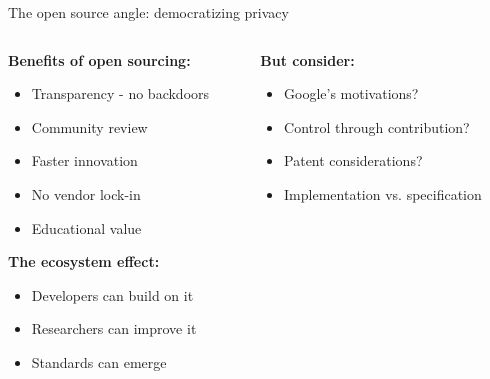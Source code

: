 \documentclass[aspectratio=169, lualatex, handout]{beamer}
\begin{document}
\begin{frame}{The open source angle: democratizing privacy}
	\begin{columns}[c]
		\begin{column}{0.5\textwidth}
			\textbf{Benefits of open sourcing:}
			\begin{itemize}
				\item Transparency - no backdoors
				\item Community review
				\item Faster innovation
				\item No vendor lock-in
				\item Educational value
			\end{itemize}
			\textbf{The ecosystem effect:}
			\begin{itemize}
				\item Developers can build on it
				\item Researchers can improve it
				\item Standards can emerge
			\end{itemize}
		\end{column}
		\begin{column}{0.5\textwidth}
			\textbf{But consider:}
			\begin{itemize}
				\item Google's motivations?
				\item Control through contribution?
				\item Patent considerations?
				\item Implementation vs. specification
			\end{itemize}
		\end{column}
	\end{columns}
\end{frame}
\end{document}

